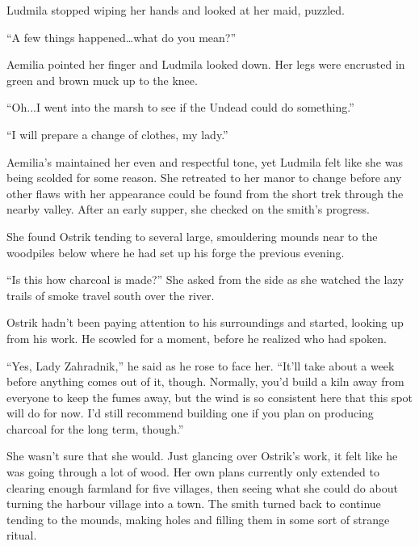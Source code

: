  

Ludmila stopped wiping her hands and looked at her maid, puzzled.

 

“A few things happened…what do you mean?”

 

Aemilia pointed her finger and Ludmila looked down. Her legs were encrusted in green and brown muck up to the knee.

 

“Oh...I went into the marsh to see if the Undead could do something.”

 

“I will prepare a change of clothes, my lady.”

 

Aemilia’s maintained her even and respectful tone, yet Ludmila felt like she was being scolded for some reason. She retreated to her manor to change before any other flaws with her appearance could be found from the short trek through the nearby valley. After an early supper, she checked on the smith’s progress.

 

She found Ostrik tending to several large, smouldering mounds near to the woodpiles below where he had set up his forge the previous evening.

 

“Is this how charcoal is made?” She asked from the side as she watched the lazy trails of smoke travel south over the river.

 

Ostrik hadn't been paying attention to his surroundings and started, looking up from his work. He scowled for a moment, before he realized who had spoken.

 

“Yes, Lady Zahradnik,” he said as he rose to face her. “It’ll take about a week before anything comes out of it, though. Normally, you’d build a kiln away from everyone to keep the fumes away, but the wind is so consistent here that this spot will do for now. I’d still recommend building one if you plan on producing charcoal for the long term, though.”

 

She wasn’t sure that she would. Just glancing over Ostrik’s work, it felt like he was going through a lot of wood. Her own plans currently only extended to clearing enough farmland for five villages, then seeing what she could do about turning the harbour village into a town. The smith turned back to continue tending to the mounds, making holes and filling them in some sort of strange ritual.

